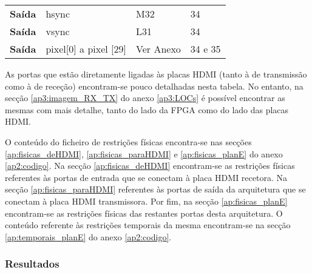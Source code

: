 \begin{table}[h!]
\begin{tabular}{rlll}
		\multicolumn{1}{r|}{\textbf{Saída}}   & hsync                                  & M32                                      & 34                                         \\
		\multicolumn{1}{r|}{\textbf{Saída}}   & vsync                                  & L31                                      & 34                                         \\
		\multicolumn{1}{r|}{\textbf{Saída}}   & pixel{[}0{]} a pixel {[}29{]}          & Ver Anexo                                & 34 e 35                                    \\ \hline
	\end{tabular}
\end{table}

As portas que estão diretamente ligadas às placas HDMI (tanto à de transmissão como à de receção) encontram-se pouco detalhadas nesta tabela. No entanto, na secção \ref{ap3:imagem_RX_TX} do anexo \ref{ap3:LOCs} é possível encontrar as mesmas com mais detalhe, tanto do lado da FPGA como do lado das placas HDMI.

O conteúdo do ficheiro de restrições físicas encontra-se nas secções \ref{ap:fisicas_deHDMI}, \ref{ap:fisicas_paraHDMI} e \ref{ap:fisicas_planE} do anexo \ref{ap2:codigo}. Na secção \ref{ap:fisicas_deHDMI} encontram-se as restrições físicas referentes às portas de entrada que se conectam à placa HDMI recetora. Na secção \ref{ap:fisicas_paraHDMI} referentes às portas de saída da arquitetura que se conectam à placa HDMI transmissora. Por fim, na secção \ref{ap:fisicas_planE} encontram-se as restrições físicas das restantes portas desta arquitetura. O conteúdo referente às restrições temporais da mesma encontram-se na secção \ref{ap:temporais_planE} do anexo \ref{ap2:codigo}.

\subsubsection{Resultados} \label{subsub:serial_planEresults}


